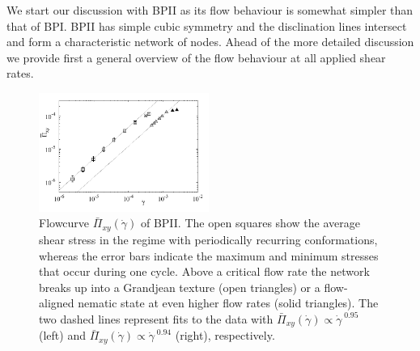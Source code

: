 \documentclass[8.5pt,twoside,twocolumn]{article}
\newcommand{\gd}{\dot{\gamma}}
\begin{document}
We start our discussion with BPII as its flow behaviour is somewhat simpler 
than that of BPI. BPII has simple cubic symmetry and the disclination lines 
intersect and form a characteristic network of nodes.
Ahead of the more detailed discussion we provide first a general overview of the 
flow behaviour at all applied shear rates.

\begin{figure}[htpb]
\includegraphics[width=0.495\textwidth]{flowcurve_bp2.pdf}
\caption{
Flowcurve $\bar{\Pi}_{xy}(\gd)$ of BPII. The open squares show the average shear stress in the regime with periodically recurring conformations,
whereas the error bars indicate the maximum and minimum stresses that occur during one cycle. Above a critical flow rate the network  
breaks up into a Grandjean texture (open triangles) or a flow-aligned nematic state at even higher flow rates (solid triangles).
The two dashed lines represent fits to the data with $\bar{\Pi}_{xy}(\gd)\propto \gd^{\;0.95}$ (left) and $\bar{\Pi}_{xy}(\gd)\propto \gd^{\;0.94}$ (right), respectively.
}
\label{bp2-flowcurve}
\end{figure}
\end{document}
